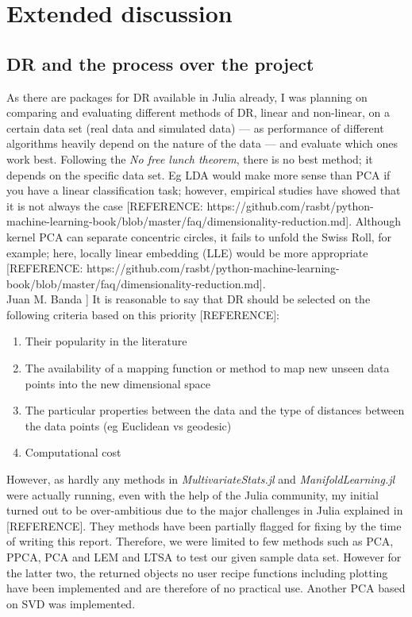 \documentclass[journal, a4paper]{IEEEtran}
\begin{document}

\section{Extended discussion}

\subsection{DR and the process over the project}\label{discussion}

As there are packages for DR available in Julia already, I was planning on comparing and evaluating different methods of DR, linear and non-linear, on a certain data set (real data and simulated data) — as performance of different algorithms heavily depend on the nature of the data — and evaluate which ones work best. Following the \textit{No free lunch theorem}, there is no best method; it depends on the specific data set.
Eg LDA would make more sense than PCA if you have a linear classification task; however, empirical studies have showed that it is not always the case [REFERENCE: https://github.com/rasbt/python-machine-learning-book/blob/master/faq/dimensionality-reduction.md]. Although kernel PCA can separate concentric circles, it fails to unfold the Swiss Roll, for example; here, locally linear embedding (LLE) would be more appropriate [REFERENCE: https://github.com/rasbt/python-machine-learning-book/blob/master/faq/dimensionality-reduction.md]. \\
Juan M. Banda ]
It is reasonable to say that DR should be selected on the following criteria based on this priority [REFERENCE]:
\begin{enumerate}
\item Their popularity in the literature
\item The availability of a mapping function or method to map new unseen data points into the new dimensional space
\item The particular properties between the data and the type of distances between the data points (eg Euclidean vs geodesic)
\item Computational cost
\end{enumerate}

However, as hardly any methods in \textit{MultivariateStats.jl} and \textit{ManifoldLearning.jl} were actually running, even with the help of the Julia community, my initial turned out to be over-ambitious due to the major challenges in Julia explained in [REFERENCE]. 
They methods have been partially flagged for fixing by the time of writing this report. Therefore, we were limited to few methods such as PCA, PPCA, PCA and LEM and LTSA to test our given sample data set. However for the latter two, the returned objects no user recipe functions including plotting have been implemented and are therefore of no practical use. Another PCA based on SVD was implemented. \\
\end{document}
